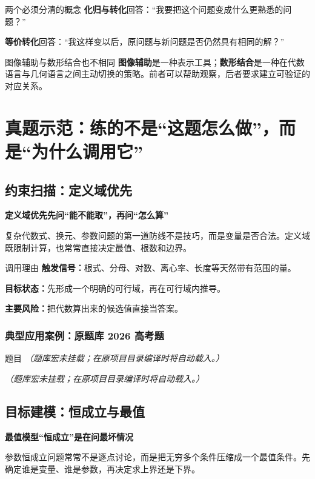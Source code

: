 \documentclass[11pt,a4paper]{ctexart}
\newcommand{\mindsetcard}[3]{%
    \begin{tcolorbox}[breakable,colback=white,colframe=black!70,boxrule=0.8pt,arc=1mm]
    {\large\bfseries #1}\hfill{\small\bfseries #2}\par\smallskip
    #3
    \end{tcolorbox}}
\newcommand{\trigger}[1]{\textbf{触发信号：}#1}
\newcommand{\goalstate}[1]{\textbf{目标状态：}#1}
\newcommand{\risk}[1]{\textbf{主要风险：}#1}
\providecommand{\MissingPoolNotice}{\textit{（题库宏未挂载；在原项目目录编译时将自动载入。）}}
\providecommand{\qHyperbolaEccentricityStem}{\MissingPoolNotice}
\providecommand{\qHyperbolaEccentricitySolution}{\MissingPoolNotice}
\begin{document}
\begin{keybox}{两个必须分清的概念}
\textbf{化归与转化}回答：“我要把这个问题变成什么更熟悉的问题？”\par
\textbf{等价转化}回答：“我这样变以后，原问题与新问题是否仍然具有相同的解？”
\end{keybox}

\begin{keybox}{图像辅助与数形结合也不相同}
\textbf{图像辅助}是一种表示工具；\textbf{数形结合}是一种在代数语言与几何语言之间主动切换的策略。前者可以帮助观察，后者要求建立可验证的对应关系。
\end{keybox}

\newpage

\section{真题示范：练的不是“这题怎么做”，而是“为什么调用它”}

\subsection{约束扫描：定义域优先}
\mindsetcard{定义域优先}{先问“能不能取”，再问“怎么算”}{复杂代数式、换元、参数问题的第一道防线不是技巧，而是变量是否合法。定义域既限制计算，也常常直接决定最值、根数和边界。}

\begin{decisionbox}{调用理由}
\trigger{根式、分母、对数、离心率、长度等天然带有范围的量。}\par
\goalstate{先形成一个明确的可行域，再在可行域内推导。}\par
\risk{把代数算出来的候选值直接当答案。}
\end{decisionbox}

\subsubsection*{典型应用案例：原题库 2026 高考题}
\begin{lessonbriefbox}{题目}
  \qHyperbolaEccentricityStem
\end{lessonbriefbox}
\qHyperbolaEccentricitySolution

\newpage

\subsection{目标建模：恒成立与最值}
\mindsetcard{最值模型}{“恒成立”是在问最坏情况}{参数恒成立问题常常不是逐点讨论，而是把无穷多个条件压缩成一个最值条件。先确定谁是变量、谁是参数，再决定求上界还是下界。}
\end{document}
